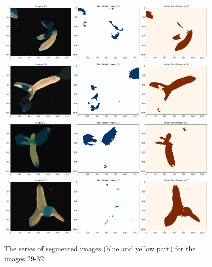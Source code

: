 \documentclass{article}
\begin{document}
\begin{figure}[h!]
\centering
\includegraphics[width=0.95\textwidth]{Report/Images/Appendix Images/ColorSegments/Image29.png}
\includegraphics[width=0.95\textwidth]{Report/Images/Appendix Images/ColorSegments/Image30.png}
\includegraphics[width=0.95\textwidth]{Report/Images/Appendix Images/ColorSegments/Image31.png}
\includegraphics[width=0.95\textwidth]{Report/Images/Appendix Images/ColorSegments/Image32.png}
\caption{The series of segmented images (blue and yellow part) for the images 29-32} 
\label{fig:segment29-32}
\end{figure}
\end{document}
